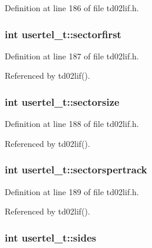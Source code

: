 Definition at line 186 of file td02lif.\+h.

\subsubsection[{\texorpdfstring{sectorfirst}{sectorfirst}}]{\setlength{\rightskip}{0pt plus 5cm}int usertel\+\_\+t\+::sectorfirst}\hypertarget{structusertel__t_ad81d010c171bf6f05db6c656d14529a3}{}\label{structusertel__t_ad81d010c171bf6f05db6c656d14529a3}


Definition at line 187 of file td02lif.\+h.



Referenced by td02lif().

\subsubsection[{\texorpdfstring{sectorsize}{sectorsize}}]{\setlength{\rightskip}{0pt plus 5cm}int usertel\+\_\+t\+::sectorsize}\hypertarget{structusertel__t_a9f850738ca0fc170eb719a66a2342063}{}\label{structusertel__t_a9f850738ca0fc170eb719a66a2342063}


Definition at line 188 of file td02lif.\+h.



Referenced by td02lif().

\subsubsection[{\texorpdfstring{sectorspertrack}{sectorspertrack}}]{\setlength{\rightskip}{0pt plus 5cm}int usertel\+\_\+t\+::sectorspertrack}\hypertarget{structusertel__t_a9a41e0e32661461716e600aa48b902c8}{}\label{structusertel__t_a9a41e0e32661461716e600aa48b902c8}


Definition at line 189 of file td02lif.\+h.



Referenced by td02lif().

\subsubsection[{\texorpdfstring{sides}{sides}}]{\setlength{\rightskip}{0pt plus 5cm}int usertel\+\_\+t\+::sides}\hypertarget{structusertel__t_a8add7bf3c4ef3422c8531c84c6f58129}{}\label{structusertel__t_a8add7bf3c4ef3422c8531c84c6f58129}


